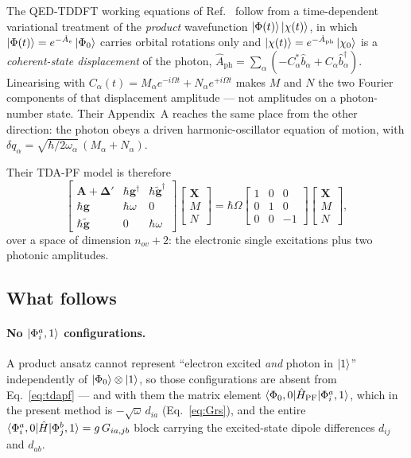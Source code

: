 \documentclass[11pt]{article}
\newcommand{\nov}{n_{ov}}
\newcommand{\bd}{\hat{b}^{\dagger}}
\newcommand{\bo}{\hat{b}}
\begin{document}
The QED-TDDFT working equations of Ref.~\cite{Yang2021} follow from a
time-dependent variational treatment of the \emph{product} wavefunction
$\ket{\Phi(t)}\ket{\chi(t)}$, in which $\ket{\Phi(t)} = e^{-\hat{A}_e}\ket{\Phi_0}$
carries orbital rotations only and
$\ket{\chi(t)} = e^{-\hat{A}_{\mathrm{ph}}}\ket{\chi_0}$ is a \emph{coherent-state
displacement} of the photon,
$\hat{A}_{\mathrm{ph}} = \sum_\alpha(-C^*_\alpha \bo_\alpha + C_\alpha \bd_\alpha)$.
Linearising with $C_\alpha(t) = M_\alpha e^{-i\Omega t} + N_\alpha e^{+i\Omega t}$
makes $M$ and $N$ the two Fourier components of that displacement amplitude ---
not amplitudes on a photon-number state. Their Appendix~A reaches the same
place from the other direction: the photon obeys a driven harmonic-oscillator
equation of motion, with
$\delta q_\alpha = \sqrt{\hbar/2\omega_\alpha}\,(M_\alpha + N_\alpha)$.

Their TDA-PF model is therefore
\begin{equation}
\begin{bmatrix}
\bm{A} + \bm{\Delta}' & \hbar\bm{g}^{\dagger} & \hbar\tilde{\bm{g}}^{\dagger} \\
\hbar\bm{g} & \hbar\omega & 0 \\
\hbar\tilde{\bm{g}} & 0 & \hbar\omega
\end{bmatrix}
\begin{bmatrix} \bm{X} \\ M \\ N \end{bmatrix}
= \hbar\Omega
\begin{bmatrix} 1 & 0 & 0 \\ 0 & 1 & 0 \\ 0 & 0 & -1 \end{bmatrix}
\begin{bmatrix} \bm{X} \\ M \\ N \end{bmatrix},
\label{eq:tdapf}
\end{equation}
over a space of dimension $\nov + 2$: the electronic single excitations plus two
photonic amplitudes.

\subsection{What follows}

\paragraph{No $\ket{\Phi_i^a, 1}$ configurations.} A product ansatz cannot
represent ``electron excited \emph{and} photon in $\ket{1}$'' independently of
$\ket{\Phi_0}\otimes\ket{1}$, so those configurations are absent from
Eq.~\eqref{eq:tdapf} --- and with them the matrix element
$\braket{\Phi_0,0|\hat{H}_{\mathrm{PF}}|\Phi_i^a,1}$, which in the present
method is $-\sqrt{\omega}\,d_{ia}$ (Eq.~\eqref{eq:Grs}), and the entire
$\braket{\Phi_i^a,0|\hat{H}|\Phi_j^b,1} = g\,G_{ia,jb}$ block carrying the
excited-state dipole differences $d_{ij}$ and $d_{ab}$.
\end{document}
